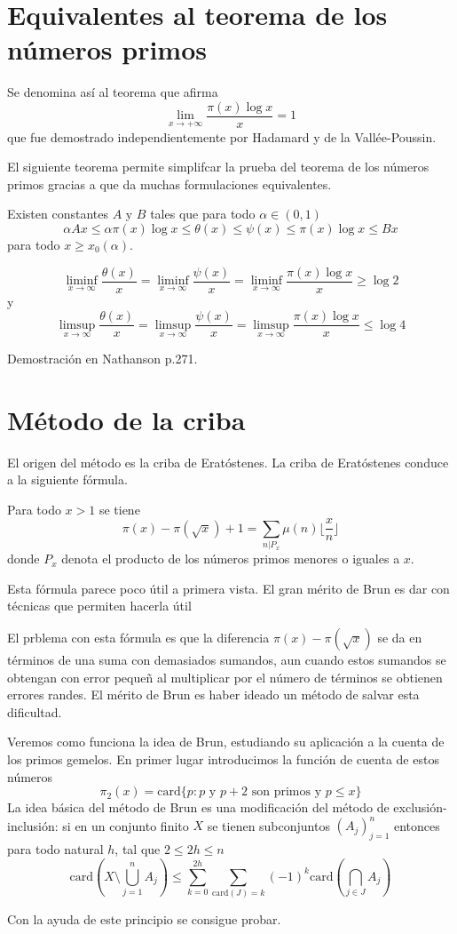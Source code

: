 \documentclass[TAN.tex]{subfiles}
\begin{document}
\section{Equivalentes al teorema de los números primos}
Se denomina así al teorema que afirma
\[ \lim_{x\to+∞} \frac{π(x)\log x}{x} = 1 \]
que fue demostrado independientemente por Hadamard y de la Vallée-Poussin.

El siguiente teorema permite simplifcar la prueba del teorema de los números primos gracias a que da muchas formulaciones equivalentes.

\begin{teorema}[Chebyshev]
Existen constantes $A$ y $B$ tales que para todo $α \in (0,1)$
\[ αAx ≤ απ(x)\log x ≤ θ(x) ≤ ψ(x) ≤ π(x)\log x ≤ Bx \]
para todo $x ≥ x_0(α)$.
\end{teorema}

\begin{teorema}[Chebyshev]
\[ \liminf_{x\to∞} \frac{θ(x)}{x} = \liminf_{x\to∞} \frac{ψ(x)}{x} = \liminf_{x\to∞} \frac{π(x)\log x}{x} ≥ \log 2 \]
y
\[ \limsup_{x\to∞} \frac{θ(x)}{x} = \limsup_{x\to∞} \frac{ψ(x)}{x} = \limsup_{x\to∞} \frac{π(x)\log x}{x} ≤ \log 4 \]
\end{teorema}
Demostración en Nathanson p.271.

\section{Método de la criba}
El origen del método es la criba de Eratóstenes. La criba de Eratóstenes conduce a la siguiente fórmula.

\begin{teorema}
Para todo $x > 1$ se tiene
\[ π(x) - π(\sqrt{x}) + 1 = \sum_{n|P_x}μ(n)\lfloor\frac{x}{n}\rfloor \]
donde $P_x$ denota el producto de los números primos menores o iguales a $x$.

Esta fórmula parece poco útil a primera vista. El gran mérito de Brun es dar con técnicas que permiten hacerla útil

El prblema con esta fórmula es que la diferencia $π(x)-π(\sqrt{x})$ se da en términos de una suma con demasiados sumandos, aun cuando estos sumandos se obtengan con error pequeñ al multiplicar por el número de términos se obtienen errores randes. El mérito de Brun es haber ideado un método de salvar esta dificultad.

Veremos como funciona la idea de Brun, estudiando su aplicación a la cuenta de los primos gemelos. En primer lugar introducimos la función de cuenta de estos números
\[ π_2(x) = \text{card}\{p : p \text{ y }p+2\text{ son primos y }p≤x\} \]
La idea básica del método de Brun es una modificación del método de exclusión-inclusión: si en un conjunto finito $X$ se tienen subconjuntos $(A_j)_{j=1}^n$ entonces para todo natural $h$, tal que $2≤2h≤n$
\[ \text{card}\left(X \setminus \bigcup_{j=1}^n A_j \right) ≤ \sum_{k=0}^{2h} \sum_{\text{card}(J)=k} (-1)^k \text{card}\left(\bigcap_{j\in J} A_j \right)\]
\end{teorema}
Con la ayuda de este principio se consigue probar.
\end{document}
